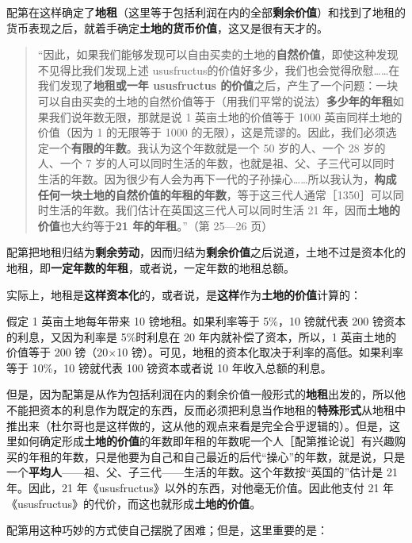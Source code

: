 配第在这样确定了\textbf{地租}（这里等于包括利润在内的全部\textbf{剩余价值}）和找到了地租的货币表现之后，就着手确定\textbf{土地的货币价值}，这又是很有天才的。

\begin{quote}“因此，如果我们能够发现可以自由买卖的土地的\textbf{自然价值}，即使这种发现不见得比我们发现上述 ususfructus的价值好多少，我们也会觉得欣慰……在我们发现了\textbf{地租或一年 ususfructus 的价值}之后，产生了一个问题：一块可以自由买卖的土地的自然价值等于（用我们平常的说法）\textbf{多少年的年租}如果我们说年数无限，那就是说 1 英亩土地的价值等于 1000 英亩同样土地的价值（因为 1 的无限等于 1000 的无限），这是荒谬的。因此，我们必须选定一个\textbf{有限的}年\textbf{数}。我认为这个年数就是一个 50 岁的人、一个 28 岁的人、一个 7 岁的人可以同时生活的年数，也就是祖、父、子三代可以同时生活的年数。因为很少有人会为再下一代的子孙操心……所以我认为，\textbf{构成任何一块土地的自然价值的年租的年数}，等于这三代人通常［1350］可以同时生活的年数。我们估计在英国这三代人可以同时生活 21 年，因而\textbf{土地的价值}也大约等于\textbf{21 年的年租}。”（第 25—26 页）\end{quote}

配第把地租归结为\textbf{剩余劳动}，因而归结为\textbf{剩余价值}之后说道，土地不过是资本化的地租，即\textbf{一定年数的年租}，或者说，一定年数的地租总额。

实际上，地租是\textbf{这样资本化}的，或者说，是\textbf{这样}作为\textbf{土地的价值}计算的：

假定 1 英亩土地每年带来 10 镑地租。如果利率等于 5\%，10 镑就代表 200 镑资本的利息，又因为利率是 5\%时利息在 20 年内就补偿了资本，所以，1 英亩土地的价值等于 200 镑（20×10 镑）。可见，地租的资本化取决于利率的高低。如果利率等于 10\%，10 镑就代表 100 镑资本或者说 10 年收入总额的利息。

但是，因为配第是从作为包括利润在内的剩余价值一般形式的\textbf{地租}出发的，所以他不能把资本的利息作为既定的东西，反而必须把利息当作地租的\textbf{特殊形式}从地租中推出来（杜尔哥也是这样做的，这从他的观点来看是完全合乎逻辑的）。但是，这里如何确定形成\textbf{土地的价值}的年数即年租的年数呢一个人［配第推论说］有兴趣购买的年租的年数，只是他要为自己和自己最近的后代“操心”的年数，就是说，只是一个\textbf{平均人}——祖、父、子三代——生活的年数。这个年数按“英国的”估计是 21 年。因此，21 年《ususfructus》以外的东西，对他毫无价值。因此他支付 21 年《ususfructus》的代价，而这也就形成\textbf{土地的价值}。

配第用这种巧妙的方式使自己摆脱了困难；但是，这里重要的是：

